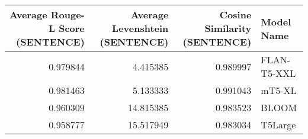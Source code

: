 \begin{tabular}{rrrl}
\toprule
Average Rouge-L Score (SENTENCE) & Average Levenshtein (SENTENCE) & Cosine Similarity (SENTENCE) & Model Name \\
\midrule
0.979844 & 4.415385 & 0.989997 & FLAN-T5-XXL \\
0.981463 & 5.133333 & 0.991043 & mT5-XL \\
0.960309 & 14.815385 & 0.983523 & BLOOM \\
0.958777 & 15.517949 & 0.983034 & T5Large \\
\bottomrule
\end{tabular}
